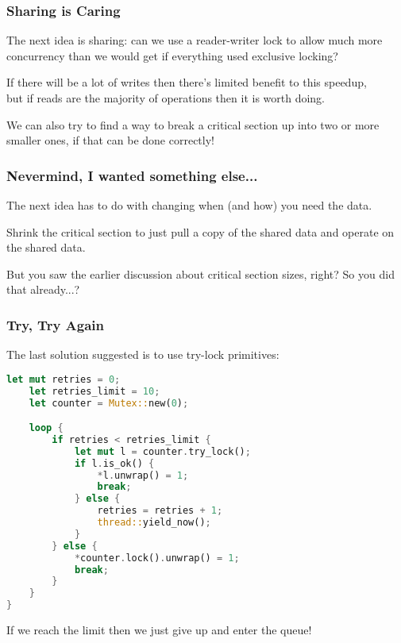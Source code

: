 \begin{frame}
\frametitle{Sharing is Caring}

The next idea is sharing: can we use a reader-writer lock to allow much more concurrency than we would get if everything used exclusive locking? 

If there will be a lot of writes then there's limited benefit to this speedup, \\
\hspace*{2em} but if reads are the majority of operations then it is worth doing. 

We can also try to find a way to break a critical section up into two or more smaller ones, if that can be done correctly!

\end{frame}

\begin{frame}
\frametitle{Nevermind, I wanted something else...}

The next idea has to do with changing when (and how) you need the data. 

Shrink the critical section to just pull a copy of the shared data and operate on the shared data. 
 
 
But you saw the earlier discussion about critical section sizes, right? So you did that already...?


\end{frame} 


\begin{frame}[fragile]
\frametitle{Try, Try Again}

The last solution suggested is to use try-lock primitives:

\begin{lstlisting}[language=Rust]
    let mut retries = 0;
    let retries_limit = 10;
    let counter = Mutex::new(0);

    loop {
        if retries < retries_limit {
            let mut l = counter.try_lock();
            if l.is_ok() {
                *l.unwrap() = 1;
                break;
            } else {
                retries = retries + 1;
                thread::yield_now();
            }
        } else {
            *counter.lock().unwrap() = 1;
            break;
        }
    }
}
\end{lstlisting}


If we reach the limit then we just give up and enter the queue!

\end{frame}




